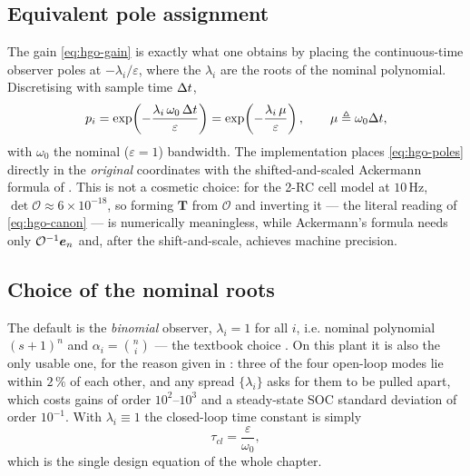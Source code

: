 \subsection{Equivalent pole assignment}
The gain \eqref{eq:hgo-gain} is exactly what one obtains by placing the continuous-time observer
poles at $-\lambda_i/\varepsilon$, where the $\lambda_i$ are the roots of the nominal polynomial.
Discretising with sample time $\Delta t$,
\begin{equation}
p_i = \exp\!\left(-\frac{\lambda_i\,\omega_0\,\Delta t}{\varepsilon}\right)
     = \exp\!\left(-\frac{\lambda_i\,\mu}{\varepsilon}\right) ,
\qquad \mu \triangleq \omega_0\Delta t ,
\label{eq:hgo-poles}
\end{equation}
with $\omega_0$ the nominal ($\varepsilon=1$) bandwidth.  The implementation places
\eqref{eq:hgo-poles} directly in the \emph{original} coordinates with the shifted-and-scaled
Ackermann formula of .  This is not a cosmetic choice: for the 2-RC cell model
at $10$\,Hz, $\det\mathcal{O}\approx6\times10^{-18}$, so forming $\bm{T}$ from $\mathcal{O}$ and
inverting it --- the literal reading of \eqref{eq:hgo-canon} --- is numerically meaningless, while
Ackermann's formula needs only $\mathcal{O}^{-1}\bm{e}_n$ and, after the shift-and-scale, achieves
machine precision.

\subsection{Choice of the nominal roots}
The default is the \emph{binomial} observer, $\lambda_i = 1$ for all $i$, i.e. nominal polynomial
$(s+1)^n$ and $\alpha_i = \binom{n}{i}$ --- the textbook choice \cite[Ex.~14.7]{khalil2002}.  On
this plant it is also the only usable one, for the reason given in : three
of the four open-loop modes lie within $2\,\%$ of each other, and any spread $\{\lambda_i\}$ asks
for them to be pulled apart, which costs gains of order $10^2$--$10^3$ and a steady-state SOC
standard deviation of order $10^{-1}$.  With $\lambda_i\equiv1$ the closed-loop time constant is
simply
\begin{equation}
\tau_{cl} = \frac{\varepsilon}{\omega_0} ,
\label{eq:hgo-tau}
\end{equation}
which is the single design equation of the whole chapter.

